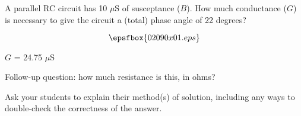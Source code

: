 

A parallel RC circuit has 10 $\mu$S of susceptance ($B$).  How much conductance ($G$) is necessary to give the circuit a (total) phase angle of 22 degrees?

$$\epsfbox{02090x01.eps}$$







$G$ = 24.75 $\mu$S

\vskip 10pt

Follow-up question: how much resistance is this, in ohms?







Ask your students to explain their method(s) of solution, including any ways to double-check the correctness of the answer.




